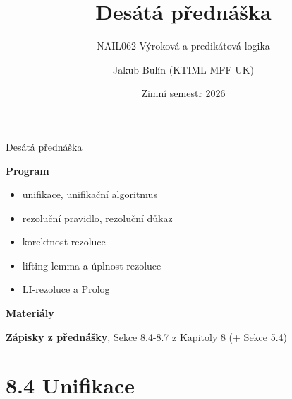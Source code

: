 \documentclass{beamer}
\title{Desátá přednáška}
\subtitle{NAIL062 Výroková a predikátová logika}
\author{Jakub Bulín (KTIML MFF UK)}
\date{Zimní semestr 2026}
\begin{document}
\maketitle


\begin{frame}{Desátá přednáška}

    \textbf{Program}
        \begin{itemize}
            \item unifikace, unifikační algoritmus
            \item rezoluční pravidlo, rezoluční důkaz
            \item korektnost rezoluce
            \item lifting lemma a úplnost rezoluce
            \item LI-rezoluce a Prolog
        \end{itemize}    

    \textbf{Materiály}

        \href{https://github.com/jbulin-mff-uk/nail062/raw/main/lecture/lecture-notes/lecture-notes.pdf}{\alert{\textbf{Zápisky z přednášky}}}, Sekce 8.4-8.7 z Kapitoly 8 (+ Sekce 5.4)

\end{frame}


\section{8.4 Unifikace}
\end{document}
